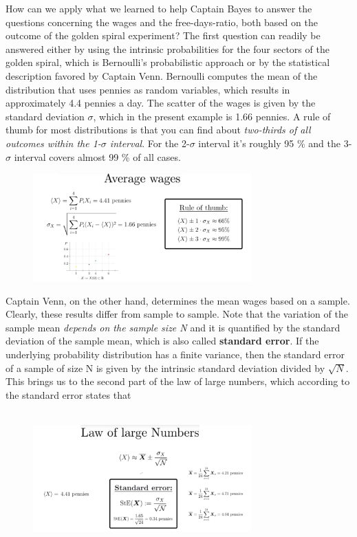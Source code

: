 \documentclass[12pt, a4paper]{scrartcl}
\begin{document}
How can we apply what we learned to help Captain Bayes to answer the questions concerning the wages and the free-days-ratio, both based on the outcome of the golden spiral experiment?
The first question can readily be answered either by using the intrinsic probabilities for the four sectors of the golden spiral, which is Bernoulli’s probabilistic approach or by the statistical description favored by Captain Venn.
Bernoulli computes the mean of the distribution that uses pennies as random variables, which results in approximately 4.4 pennies a day.
The scatter of the wages is given by the standard deviation $\sigma$, which in the present example is 1.66 pennies.
A rule of thumb for most distributions is that you can find about \textit{two-thirds of all outcomes within the 1-$\sigma$ interval}. For the 2-$\sigma$ interval it's roughly 95 \% and the 3-$\sigma$ interval covers almost 99 \% of all cases.
\begin{figure}[H]
	\centering
	\includegraphics[width=0.75\textwidth]{2_10.png}
\end{figure}
Captain Venn, on the other hand, determines the mean wages based on a sample. Clearly, these results differ from sample to sample.
Note that the variation of the sample mean \textit{depends on the sample size N} and it is quantified by the standard deviation of the sample mean, which is also called \textbf{standard error}.
If the underlying probability distribution has a finite variance, then the standard error of a sample of size N is given by the intrinsic standard deviation divided by $\sqrt{N}$.\\%

This brings us to the second part of the law of large numbers, which according to the standard error states that \\

\\
\begin{figure}[H]
	\centering
	\includegraphics[width=0.75\textwidth]{2_11.png}
\end{figure}
\end{document}

